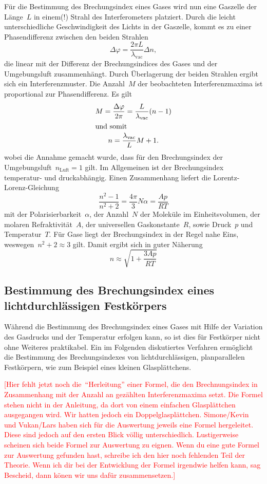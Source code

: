 Für die Bestimmung des Brechungsindex eines Gases wird nun eine Gaszelle der
Länge~$L$ in einem(!) Strahl des Interferometers platziert. Durch die leicht
unterschiedliche Geschwindigkeit des Lichts in der Gaszelle, kommt es zu einer
Phasendifferenz zwischen den beiden Strahlen
\begin{equation}
  \Delta\varphi=\frac{2\pi L}{\lambda_{\text{vac}}}\Delta n,
\end{equation}
die linear mit der Differenz der Brechungsindices des Gases und der
Umgebungsluft zusammenhängt. Durch Überlagerung der beiden Strahlen ergibt sich
ein Interferenzmuster. Die Anzahl~$M$ der beobachteten Interferenzmaxima ist
proportional zur Phasendifferenz. Es gilt
\begin{gather}
  M=\frac{\Delta\varphi}{2\pi}=\frac{L}{\lambda_{\text{vac}}}(n-1) \\
  \shortintertext{und somit}
  n=\frac{\lambda_{\text{vac}}}{L}M+1.
  \label{eq:brechungsindex_gas}
\end{gather}
wobei die Annahme gemacht wurde, dass für den Brechungsindex der
Umgebungsluft~$n_{\text{Luft}}=1$ gilt. Im Allgemeinen ist der Brechungsindex
temperatur- und druckabhängig. Einen Zusammenhang liefert die
Lorentz-Lorenz-Gleichung
\begin{equation}
  \frac{n^2-1}{n^2+2}=\frac{4\pi}{3}N\alpha=\frac{Ap}{RT}
\end{equation}
mit der Polarisierbarkeit~$\alpha$, der Anzahl~$N$ der Moleküle im
Einheitsvolumen, der molaren Refraktivität~$A$, der universellen
Gaskonstante~$R$, sowie Druck~$p$ und Temperatur~$T$. Für Gase liegt der
Brechungsindex in der Regel nahe Eins, weswegen~$n^2+2\approx3$ gilt. Damit
ergibt sich in guter Näherung
\begin{equation}
  n\approx\sqrt{1+\frac{3Ap}{RT}}
\end{equation}

\subsection{Bestimmung des Brechungsindex eines lichtdurchlässigen Festkörpers}
Während die Bestimmung des Brechungsindex eines Gases mit Hilfe der Variation
des Gasdrucks und der Temperatur erfolgen kann, so ist dies für Festkörper nicht
ohne Weiteres praktikabel. Ein im Folgenden diskutiertes Verfahren ermöglicht
die Bestimmung des Brechungsindexes von lichtdurchlässigen, planparallelen
Festkörpern, wie zum Beispiel eines kleinen Glasplättchens.

\textcolor{red}{[Hier fehlt jetzt noch die~\enquote{Herleitung} einer Formel,
die den Brechnungsindex in Zusammenhang mit der Anzahl an gezählten
Interferenzmaxima setzt. Die Formel stehen nicht in der Anleitung, da dort von
einem einfachen Glasplättchen ausgegangen wird. Wir hatten jedoch ein
Doppelglasplättchen. Simone/Kevin und Vukan/Lars haben sich für die Auswertung
jeweils eine Formel hergeleitet. Diese sind jedoch auf den ersten Blick völlig
unterschiedlich. Lustigerweise scheinen sich beide Formel zur Auswertung zu
eignen. Wenn du eine gute Formel zur Auswertung gefunden hast, schreibe ich den
hier noch fehlenden Teil der Theorie. Wenn ich dir bei der Entwicklung der
Formel irgendwie helfen kann, sag Bescheid, dann könen wir uns dafür
zusammensetzen.]}
